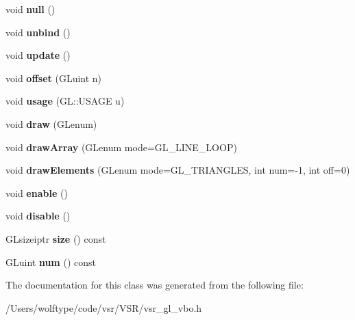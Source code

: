 \begin{DoxyCompactItemize}
\item 
\hypertarget{classvsr_1_1_v_b_o_a6f8815ad8eafcc2833918eb7512cdfb8}{void {\bfseries null} ()}\label{classvsr_1_1_v_b_o_a6f8815ad8eafcc2833918eb7512cdfb8}

\item 
\hypertarget{classvsr_1_1_v_b_o_aeae95d4fbebbcc9cc892296a3eaa137f}{void {\bfseries unbind} ()}\label{classvsr_1_1_v_b_o_aeae95d4fbebbcc9cc892296a3eaa137f}

\item 
\hypertarget{classvsr_1_1_v_b_o_a2d8aae0fa0d0ae789f0756e32edcf213}{void {\bfseries update} ()}\label{classvsr_1_1_v_b_o_a2d8aae0fa0d0ae789f0756e32edcf213}

\item 
\hypertarget{classvsr_1_1_v_b_o_abc4464b094c8141d1d65e155bb6c0bb7}{void {\bfseries offset} (G\-Luint n)}\label{classvsr_1_1_v_b_o_abc4464b094c8141d1d65e155bb6c0bb7}

\item 
\hypertarget{classvsr_1_1_v_b_o_a5269ab474ca668e5ba0d170316770f40}{void {\bfseries usage} (G\-L\-::\-U\-S\-A\-G\-E u)}\label{classvsr_1_1_v_b_o_a5269ab474ca668e5ba0d170316770f40}

\item 
\hypertarget{classvsr_1_1_v_b_o_a9cb4238a311fd4d505254e6125d3091f}{void {\bfseries draw} (G\-Lenum)}\label{classvsr_1_1_v_b_o_a9cb4238a311fd4d505254e6125d3091f}

\item 
\hypertarget{classvsr_1_1_v_b_o_ac6f344b25e338cd037a49c81f70581d8}{void {\bfseries draw\-Array} (G\-Lenum mode=G\-L\-\_\-\-L\-I\-N\-E\-\_\-\-L\-O\-O\-P)}\label{classvsr_1_1_v_b_o_ac6f344b25e338cd037a49c81f70581d8}

\item 
\hypertarget{classvsr_1_1_v_b_o_af02acfb28b52566eb7f530154bb302dc}{void {\bfseries draw\-Elements} (G\-Lenum mode=G\-L\-\_\-\-T\-R\-I\-A\-N\-G\-L\-E\-S, int num=-\/1, int off=0)}\label{classvsr_1_1_v_b_o_af02acfb28b52566eb7f530154bb302dc}

\item 
\hypertarget{classvsr_1_1_v_b_o_a093ee6031aa2dc0f894efd4c369bc207}{void {\bfseries enable} ()}\label{classvsr_1_1_v_b_o_a093ee6031aa2dc0f894efd4c369bc207}

\item 
\hypertarget{classvsr_1_1_v_b_o_a61a5d595875e9ad2807e24058f1c7288}{void {\bfseries disable} ()}\label{classvsr_1_1_v_b_o_a61a5d595875e9ad2807e24058f1c7288}

\item 
\hypertarget{classvsr_1_1_v_b_o_ae59a6f5237c8173aaed86e50a2f5f80b}{G\-Lsizeiptr {\bfseries size} () const }\label{classvsr_1_1_v_b_o_ae59a6f5237c8173aaed86e50a2f5f80b}

\item 
\hypertarget{classvsr_1_1_v_b_o_af571e237323023d1a53bb2bd8449951a}{G\-Luint {\bfseries num} () const }\label{classvsr_1_1_v_b_o_af571e237323023d1a53bb2bd8449951a}

\end{DoxyCompactItemize}


The documentation for this class was generated from the following file\-:\begin{DoxyCompactItemize}
\item 
/\-Users/wolftype/code/vsr/\-V\-S\-R/vsr\-\_\-gl\-\_\-vbo.\-h\end{DoxyCompactItemize}
